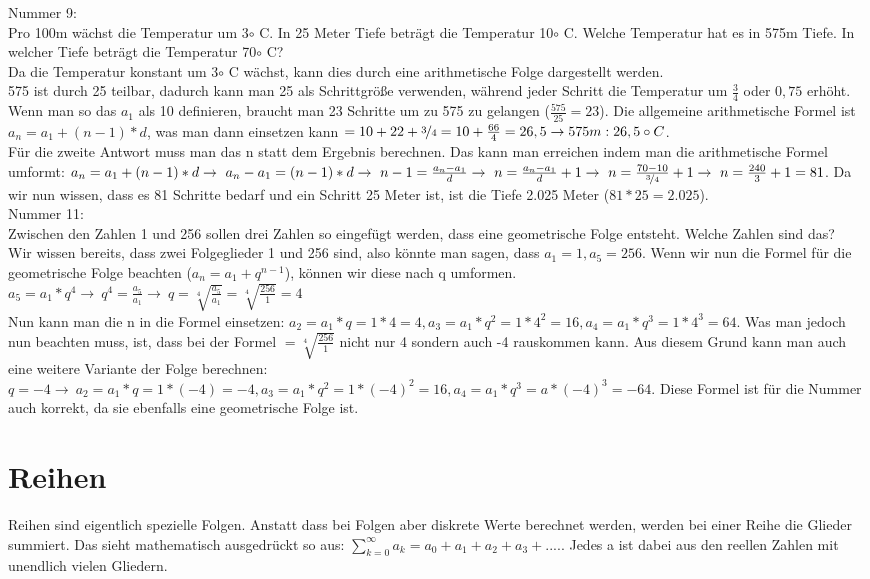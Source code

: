 \documentclass{article}
\begin{document}
	Nummer 9: \\
	Pro 100m wächst die Temperatur um 3$\circ$ C. In 25 Meter Tiefe beträgt die Temperatur 10$\circ$ C. Welche Temperatur hat es in 575m Tiefe. In welcher Tiefe beträgt die Temperatur 70$\circ$ C? \\
	Da die Temperatur konstant um 3$\circ$ C wächst, kann dies durch eine arithmetische Folge dargestellt werden. \\
	575 ist durch 25 teilbar, dadurch kann man 25 als Schrittgröße verwenden, während jeder Schritt die Temperatur um $\frac{3}{4}$ oder $0,75$ erhöht. Wenn man so das $a_1$ als 10 definieren, braucht man 23 Schritte um zu 575 zu gelangen ($\frac{575}{25}=23$). Die allgemeine arithmetische Formel ist $a_n=a_1+(n-1)*d$, was man dann einsetzen kann $=10+22+\nicefrac{3}{4}=10+\frac{66}{4}=26,5\to 575m:26,5\circ C$. \\
	Für die zweite Antwort muss man das n statt dem Ergebnis berechnen. Das kann man erreichen indem man die arithmetische Formel umformt: $a_n=a_1+(n-1)*d\to\ a_n-a_1=(n-1)*d\to\ n-1=\frac{a_n-a_1}{d}\to\ n=\frac{a_n-a_1}{d}+1\to\ n=\frac{70-10}{\nicefrac{3}{4}}+1\to\ n=\frac{240}{3}+1=81$. Da wir nun wissen, dass es 81 Schritte bedarf und ein Schritt 25 Meter ist, ist die Tiefe 2.025 Meter ($81*25=2.025$). \\
	Nummer 11: \\
	Zwischen den Zahlen 1 und 256 sollen drei Zahlen so eingefügt werden, dass eine geometrische Folge entsteht. Welche Zahlen sind das? \\ 
	Wir wissen bereits, dass zwei Folgeglieder 1 und 256 sind, also könnte man sagen, dass $a_1=1, a_5=256$. Wenn wir nun die Formel für die geometrische Folge beachten ($a_n=a_1+q^{n-1}$), können wir diese nach q umformen.\\
	$a_5=a_1*q^4\to\ q^4=\frac{a_5}{a_1}\to\ q=\sqrt[4]{\frac{a_5}{a_1}}=\sqrt[4]{\frac{256}{1}}=4$\\
	Nun kann man die n in die Formel einsetzen: $a_2=a_1*q=1*4=4, a_3=a_1*q^2=1*4^2=16, a_4=a_1*q^3=1*4^3=64$. Was man jedoch nun beachten muss, ist, dass bei der Formel $=\sqrt[4]{\frac{256}{1}}$ nicht nur 4 sondern auch -4 rauskommen kann. Aus diesem Grund kann man auch eine weitere Variante der Folge berechnen: $q=-4\to\ a_2=a_1*q=1*(-4)=-4, a_3=a_1*q^2=1*(-4)^2=16, a_4=a_1*q^3=a*(-4)^3=-64$. Diese Formel ist für die Nummer auch korrekt, da sie ebenfalls eine geometrische Folge ist. \\
	\section{Reihen}
	Reihen sind eigentlich spezielle Folgen. Anstatt dass bei Folgen aber diskrete Werte berechnet werden, werden bei einer Reihe die Glieder summiert. Das sieht mathematisch ausgedrückt so aus: $\sum^{\infty}_{k=0}a_k=a_0+a_1+a_2+a_3+....$. Jedes a ist dabei aus den reellen Zahlen mit unendlich vielen Gliedern.
\end{document}
